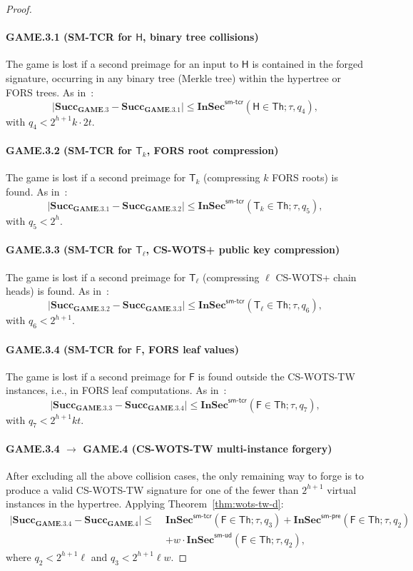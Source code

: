 \documentclass[11pt,a4paper]{article}
\newcommand{\F}{\mathsf{F}}
\newcommand{\Hfunc}{\mathsf{H}}
\newcommand{\Th}{\mathsf{Th}}
\newcommand{\T}{\mathsf{T}}
\newcommand{\InSec}[1]{\mathbf{InSec}^{\mathsf{#1}}}
\newcommand{\Succ}{\mathbf{Succ}}
\newcommand{\GAME}{\mathbf{GAME}}
\begin{document}
\begin{proof}
\paragraph{GAME.3.1 (SM-TCR for $\Hfunc$, binary tree collisions)}
The game is lost if a second preimage for an input to $\Hfunc$ is contained in the forged signature, occurring in any binary tree (Merkle tree) within the hypertree or FORS trees. As in~\cite[Eq.~(7)]{HK22}:
\[
|\Succ_{\GAME.3} - \Succ_{\GAME.3.1}| \le \InSec{sm\text{-}tcr}(\Hfunc \in \boldsymbol{\Th}; \tau, q_4),
\]
with $q_4 < 2^{h+1}k \cdot 2t$.

\paragraph{GAME.3.2 (SM-TCR for $\T_k$, FORS root compression)}
The game is lost if a second preimage for $\T_k$ (compressing $k$ FORS roots) is found. As in~\cite[Eq.~(8)]{HK22}:
\[
|\Succ_{\GAME.3.1} - \Succ_{\GAME.3.2}| \le \InSec{sm\text{-}tcr}(\T_k \in \boldsymbol{\Th}; \tau, q_5),
\]
with $q_5 < 2^h$.

\paragraph{GAME.3.3 (SM-TCR for $\T_\ell$, CS-WOTS+ public key compression)}
The game is lost if a second preimage for $\T_\ell$ (compressing $\ell$ CS-WOTS+ chain heads) is found. As in~\cite[Eq.~(9)]{HK22}:
\[
|\Succ_{\GAME.3.2} - \Succ_{\GAME.3.3}| \le \InSec{sm\text{-}tcr}(\T_\ell \in \boldsymbol{\Th}; \tau, q_6),
\]
with $q_6 < 2^{h+1}$.

\paragraph{GAME.3.4 (SM-TCR for $\F$, FORS leaf values)}
The game is lost if a second preimage for $\F$ is found outside the CS-WOTS-TW instances, i.e., in FORS leaf computations. As in~\cite[Eq.~(10)]{HK22}:
\[
|\Succ_{\GAME.3.3} - \Succ_{\GAME.3.4}| \le \InSec{sm\text{-}tcr}(\F \in \boldsymbol{\Th}; \tau, q_7),
\]
with $q_7 < 2^{h+1}kt$.

\paragraph{GAME.3.4 $\to$ GAME.4 (CS-WOTS-TW multi-instance forgery)}
After excluding all the above collision cases, the only remaining way to forge is to produce a valid CS-WOTS-TW signature for one of the fewer than $2^{h+1}$ virtual instances in the hypertree. Applying Theorem~\ref{thm:wots-tw-d}:
\begin{align*}
|\Succ_{\GAME.3.4} - \Succ_{\GAME.4}| \le \;
&\InSec{sm\text{-}tcr}(\F \in \boldsymbol{\Th}; \tau, q_3)
+ \InSec{sm\text{-}pre}(\F \in \boldsymbol{\Th}; \tau, q_2) \\
&+ w \cdot \InSec{sm\text{-}ud}(\F \in \boldsymbol{\Th}; \tau, q_2),
\end{align*}
where $q_2 < 2^{h+1}\ell$ and $q_3 < 2^{h+1}\ell w$.


\end{proof}
\end{document}
